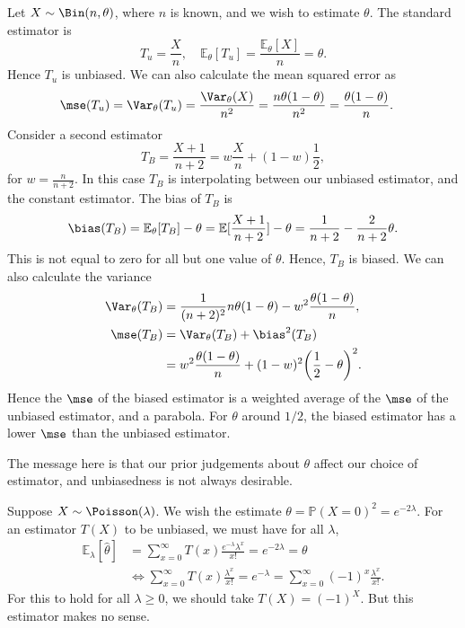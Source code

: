 \documentclass[12pt]{article}
\begin{document}
\begin{exbox}
	Let $X \sim \Bin(n, \theta)$, where $n$ is known, and we wish to estimate $\theta$. The standard estimator is
	\[
	T_u = \frac{X}{n}, \quad \mathbb{E}_\theta[T_u] = \frac{\mathbb{E}_\theta[X]}{n} = \theta
	.\]
	Hence $T_u$ is unbiased. We can also calculate the mean squared error as
	\begin{align*}
		\mse(T_u) &= \Var_\theta(T_u) = \frac{\Var_\theta(X)}{n^2} = \frac{n\theta(1-\theta)}{n^2} = \frac{\theta(1-\theta)}{n}.
	\end{align*}
	Consider a second estimator
	\[
	T_B = \frac{X+1}{n+2} = w\frac{X}{n} + (1-w)\frac{1}{2}
	,\]
	for $w = \frac{n}{n+2}$. In this case $T_B$ is interpolating between our unbiased estimator, and the constant estimator. The bias of $T_B$ is
	\[
	\bias(T_B) = \mathbb{E}_\theta[T_B] - \theta = \mathbb{E}[\frac{X+1}{n+2}] - \theta = \frac{1}{n+2} - \frac{2}{n+2}\theta
	.\]
	This is not equal to zero for all but one value of $\theta$. Hence, $T_B$ is biased. We can also calculate the variance
	\begin{align*}
		\Var_{\theta}(T_B) &= \frac{1}{(n+2)^2}n\theta(1-\theta) - w^2 \frac{\theta(1-\theta)}{n}, \\
		\mse(T_B) &= \Var_{\theta}(T_B) + \bias^2(T_B) \\
			  &= w^2\frac{\theta(1-\theta)}{n} + (1-w)^2 \biggl(\frac{1}{2} - \theta\biggr)^2.
	\end{align*}
	Hence the $\mse$ of the biased estimator is a weighted average of the $\mse$ of the unbiased estimator, and a parabola. For $\theta$ around $1/2$, the biased estimator has a lower $\mse$ than the unbiased estimator.
\end{exbox}

The message here is that our prior judgements about $\theta$ affect our choice of estimator, and unbiasedness is not always desirable.

\begin{exbox}
	Suppose $X \sim \Poisson(\lambda)$. We wish the estimate $\theta = \mathbb{P}(X = 0)^2 = e^{-2\lambda}$. For an estimator $T(X)$ to be unbiased, we must have for all $\lambda$,
	\begin{align*}
		\mathbb{E}_\lambda[\hat \theta] &= \sum_{x = 0}^{\infty}T(x) \frac{e^{-\lambda} \lambda^{x}}{x!} = e^{-2 \lambda} = \theta \\
						&\iff \sum_{x = 0}^{\infty}T(x) \frac{\lambda^{x}}{x!} = e^{-\lambda} = \sum_{x = 0}^{\infty}(-1)^{x} \frac{\lambda^{x}}{x!}.
	\end{align*}
	For this to hold for all $\lambda \geq 0$, we should take $T(X) = (-1)^{X}$. But this estimator makes no sense.
\end{exbox}
\end{document}

